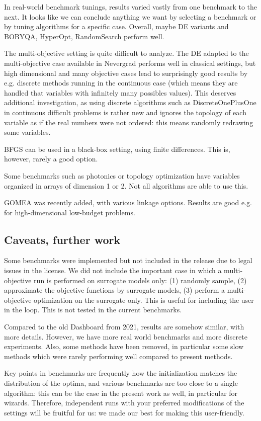 In real-world benchmark tunings, results varied vastly from one benchmark to the next.  It looks like we can conclude 
anything we want by selecting a benchmark or by tuning algorithms for a specific case. Overall, maybe DE variants and
BOBYQA, HyperOpt, RandomSearch perform well.

The multi-objective setting is quite difficult to analyze. The DE adapted to the multi-objective case available in
Nevergrad\cite{pde,mode} performs well in classical settings, but high dimensional and many objective cases lead to surprisingly good
results  by e.g. discrete methods running in the continuous case (which means they are handled that variables with
infinitely many possibles values). This deserves additional investigation, as using discrete algorithms such as
DiscreteOnePlusOne in continuous difficult problems is rather new and ignores the topology of each variable as if the
real numbers were not ordered: this means randomly redrawing some variables.

BFGS can be used in a black-box setting, using finite differences. This is, however, rarely a good option.

Some benchmarks such as photonics or topology optimization have variables organized in arrays of dimension 1 or 2. Not
all algorithms are able to use this.

GOMEA was recently added, with various linkage options. Results are good e.g. for high-dimensional low-budget problems.

\subsection{Caveats, further work}
Some benchmarks were implemented but not included in the release due to legal issues in the license. 
We did not include the important case in which a multi-objective run is performed on surrogate models only: (1) randomly sample, (2) approximate the objective functions by surrogate models, (3) perform a multi-objective optimization on the surrogate only. This is useful for including the user in the loop. This is not tested in the current benchmarks.

Compared to the old Dashboard from 2021, results are somehow similar, with more details. However, we have more real world benchmarks and more discrete experiments. Also,
some methods have been removed, in particular some slow methods which were rarely performing well compared to present methods.

Key points in benchmarks are frequently how the initialization matches the distribution of the optima, and various
benchmarks are too close to a single algorithm: this can be the case in the present work as well, in particular for
wizards. Therefore, independent runs with your preferred modifications of the settings will be fruitful for us: we made our best
for making this user-friendly.
